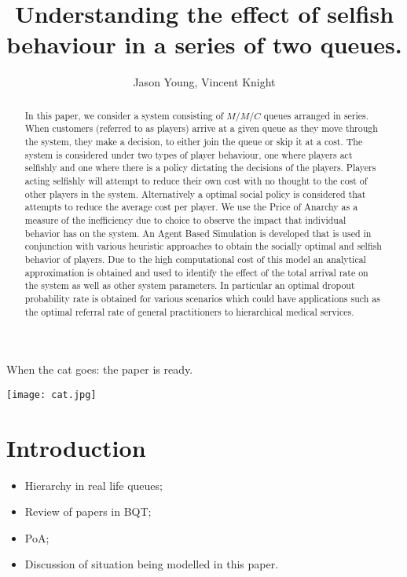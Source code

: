 \documentclass[12pt]{article}
\title{Understanding the effect of selfish behaviour in a series of two queues.}
\author{Jason Young, Vincent Knight}
\begin{document}
When the cat goes: the paper is ready.

\begin{center}
  \texttt{[image: cat.jpg]}
\end{center}

\maketitle

\begin{abstract}

In this paper, we consider a system consisting of $M/M/C$ queues arranged in series. When customers (referred to as players) arrive at a given queue as they move through the system, they make a decision, to either join the queue or skip it at a cost. The system is considered under two types of player behaviour, one where players act selfishly and one where there is a policy dictating the decisions of the players. Players acting selfishly will attempt to reduce their own cost with no thought to the cost of other players in the system. Alternatively a optimal social policy is considered that attempts to reduce the average cost per player. We use the Price of Anarchy as a measure of the inefficiency due to choice to observe the impact that individual behavior has on the system. An Agent Based Simulation is developed that is used in conjunction with various heuristic approaches to obtain the socially optimal and selfish behavior of players. Due to the high computational cost of this model an analytical approximation is obtained and used to identify the effect of the total arrival rate on the system as well as other system parameters. In particular an optimal dropout probability rate is obtained for various scenarios which could have applications such as the optimal referral rate of general practitioners to hierarchical medical services.

\end{abstract}

\section{Introduction}\label{Introduction}

\begin{itemize}
    \item Hierarchy in real life queues;
    \item Review of papers in BQT;
    \item PoA;
    \item Discussion of situation being modelled in this paper.
\end{itemize}
\end{document}
